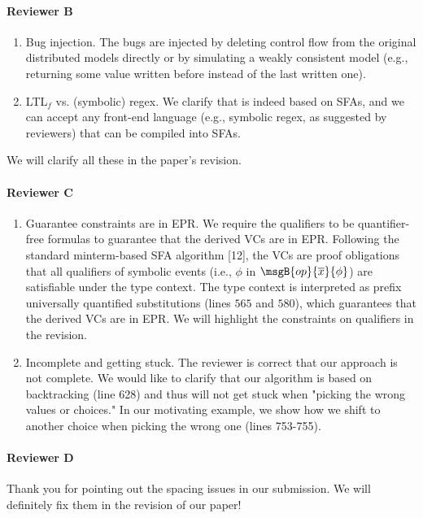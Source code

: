 \paragraph{Reviewer B}
\begin{enumerate}
    \item Bug injection. The bugs are injected by deleting control flow from the original distributed models directly or by simulating a weakly consistent model (e.g., returning some value written before instead of the last written one).
    \item LTL$_f$ vs. (symbolic) regex. We clarify that \PAT is indeed based on SFAs, and we can accept any front-end language (e.g., symbolic regex, as suggested by reviewers) that can be compiled into SFAs.
\end{enumerate}
We will clarify all these in the paper's revision.

\paragraph{Reviewer C}
\begin{enumerate}
    \item Guarantee constraints are in EPR. We require the qualifiers to be quantifier-free formulas to guarantee that the derived VCs are in EPR. Following the standard minterm-based SFA algorithm [12], the VCs are proof obligations that all qualifiers of symbolic events (i.e., $\phi$ in $\msgB{op}{\overline{x}}{\phi}$) are satisfiable under the type context. The type context is interpreted as prefix universally quantified substitutions (lines $565$ and $580$), which guarantees that the derived VCs are in EPR. We will highlight the constraints on qualifiers in the revision.
    \item Incomplete and getting stuck. The reviewer is correct that our approach is not complete. We would like to clarify that our algorithm is based on backtracking (line 628) and thus will not get stuck when "picking the wrong values or choices." In our motivating example, we show how we shift to another choice when picking the wrong one (lines 753-755).
\end{enumerate}

\paragraph{Reviewer D} Thank you for pointing out the spacing issues in our submission. We will definitely fix them in the revision of our paper!

